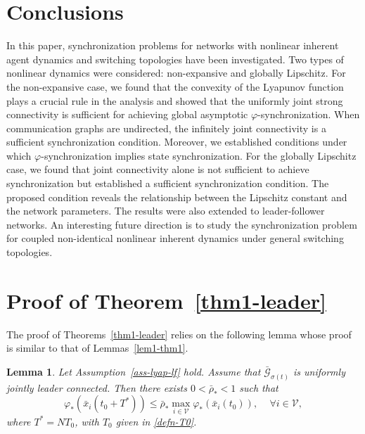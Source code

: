 \documentclass[a4paper, 11pt]{article}
\newtheorem{lemma}{Lemma}
\begin{document}
\section{Conclusions}\label{sec-conclusion}
In this paper, synchronization problems for networks with nonlinear inherent agent dynamics and switching topologies
have been investigated. Two types of nonlinear dynamics were considered: non-expansive and globally Lipschitz.
For the non-expansive case, we found that the convexity of the Lyapunov function plays a crucial rule in the analysis
and showed that the uniformly joint strong connectivity is sufficient for achieving global asymptotic $\varphi$-synchronization.
When communication graphs are undirected, the infinitely joint connectivity is a sufficient synchronization condition.
Moreover, we established conditions under which $\varphi$-synchronization implies state synchronization.
For the globally Lipschitz case, we found that joint connectivity alone is not sufficient to achieve synchronization
but established a sufficient synchronization condition. The proposed condition reveals the relationship between the Lipschitz constant and the network parameters. 
The results were also extended to leader-follower networks.
An interesting future direction is to study the synchronization problem for coupled non-identical nonlinear inherent dynamics under general switching topologies.






\appendix

\section{Proof of Theorem~\ref{thm1-leader}}\label{app-lf1}
The proof of Theorems~\ref{thm1-leader} relies on the following lemma whose proof is similar to that of Lemmas~\ref{lem1-thm1}.
\begin{lemma}\label{lem1-thm3}
Let Assumption~\ref{ass-lyap-lf} hold.  Assume that $\bar{\mathcal{G}}_{\sigma(t)}$ is uniformly jointly leader connected.
Then there exists $0<\bar{\rho}_*<1$ such that
\[
\varphi_*(\bar{x}_i(t_0+T^*)) \leq \bar{\rho}_* \max_{i \in \mathcal{V}}\varphi_*(\bar{x}_i(t_0)), \quad \, \forall i \in \mathcal{V},
\]
where $T^*=NT_0$, with $T_0$ given in \eqref{defn-T0}.
\end{lemma}
\end{document}
